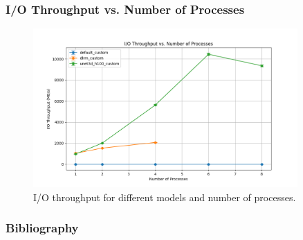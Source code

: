 \documentclass[brazil, bsc, 10pt]{beamer}
\begin{document}
\begin{frame}
	\frametitle{I/O Throughput vs. Number of Processes}
	\begin{figure}
		\centering
		\includegraphics[width=0.9\textwidth]{images/io.png}
		\caption{I/O throughput for different models and number of processes.}
	\end{figure}
\end{frame}


\begin{frame}[allowframebreaks]
	\frametitle{Bibliography}
	
\end{frame}
\end{document}
